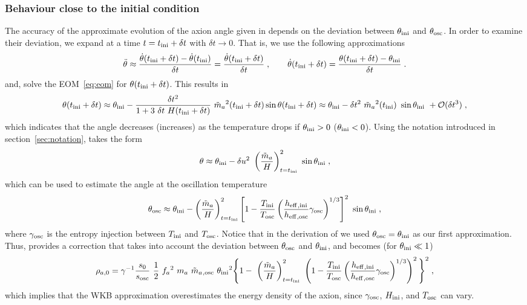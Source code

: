 \documentclass[11pt,a4paper]{article}
\begin{document}
\subsubsection{Behaviour close to the initial condition}\label{sec:close_to_ini}
%
The accuracy of the approximate evolution of the axion angle given in  depends on the deviation between $\theta_{\rm ini}{}$ and $\theta_{\rm osc}{}$. In order to examine their deviation, we expand  at a time $t =t_{\rm ini}{} + \delta t$ with $\delta t \to 0$. That is, we use the following approximations 
%
\begin{equation*}
	\ddot{\theta} \approx \dfrac{\dot \theta (t_{\rm ini}{}+ \delta t)  - \dot \theta (t_{\rm ini}{})}{ \delta  t } =  \dfrac{\dot \theta (t_{\rm ini}{} + \delta t)  }{\delta  t } \;,
	\qquad
	\dot \theta(t_{\rm ini}{} + \delta t) = \dfrac{\theta(t_{\rm ini}{} + \delta t) - \theta_{\rm ini}{}}{\delta t} \;.
\end{equation*} 
%
and, solve the EOM~\ref{eq:eom} for $\theta(t_{\rm ini}{} + \delta t)$. This results in
%
\begin{equation}
	\theta(t_{\rm ini}{} + \delta t)  \approx  \theta_{\rm ini}{} -\dfrac{\delta t^2}{1+3\ \delta t \ H(t_{\rm ini}{} + \delta t) } \  \tilde m_{a}{}^2(t_{\rm ini}{} + \delta t)  \sin \theta(t_{\rm ini}{} + \delta t)  
	\approx   \theta_{\rm ini}{} - \delta t^2 \ \tilde m_{a}{}^2(t_{\rm ini}{}) \ \sin \theta_{\rm ini}{}  \ + \mathcal{O}(\delta t^3)\;, 
	\label{eq:theta_dt}
\end{equation}
%
which indicates that the angle decreases (increases) as the temperature drops if $\theta_{\rm ini}{}>0$ ($\theta_{\rm ini}{}<0$). Using the notation introduced in section~\ref{sec:notation},  takes the form
%
\begin{eqnarray}
	\theta \approx    \thetai - \delta u^2 \ \lrb{\dfrac{\maT}{H}}_{t=\ti}^2 \ \sin \thetai \;,
	\label{eq:theta_du}
\end{eqnarray}
%
which can be used to estimate the angle at the oscillation temperature
%
\begin{eqnarray}
	\theta_{\rm osc}{} \approx    \theta_{\rm ini}{} -  \left( \dfrac{\tilde m_{a}{}}{H} \right)_{t=t_{\rm ini}{}}^2 
	\left[ 1- \dfrac{T_{\rm ini}{}}{T_{\rm osc}{}}\left( \dfrac{h_{\rm eff}{}_{,\rm ini}}{h_{\rm eff}{}_{,\rm osc}}\gamma_{\rm osc} \right)^{1/3} \right]^{2}   \ \sin \theta_{\rm ini}{} \;,
	\label{eq:theta_osc}
\end{eqnarray}
%
where  $\gamma_{\rm osc}$ is the entropy injection between $T_{\rm ini}{}$ and $T_{\rm osc}{}$. Notice that in the derivation of  we used $\theta_{\rm osc} = \theta_{\rm ini}{}$ as our first approximation. Thus,  provides a correction that takes into account the deviation between $\theta_{\rm osc} $ and $ \theta_{\rm ini}{}$, and  becomes (for $\theta_{\rm ini}{} \ll 1$)
%
\begin{eqnarray}
	\rho_{a,0} = \gamma^{-1}  \dfrac{s_0}{s_{\rm osc}} \  \dfrac{1 }{2}  \ f_{a}{}^2 \ m_{a}{} \ \tilde m_{a}{}_{,{\rm osc}} \ \theta_{\rm ini}{}^2 \Bigg\{ 
		1 - \ \left( \dfrac{\tilde m_{a}{}}{H} \right)_{t=t_{\rm ini}{}}^2 \  \left( 1- \dfrac{T_{\rm ini}{}}{T_{\rm osc}{}}\left( \dfrac{h_{\rm eff}{}_{,\rm ini}}{h_{\rm eff}{}_{,\rm osc}}\gamma_{\rm osc} \right)^{1/3} \right)^{2}    \Bigg\}^2    \;,
	\label{eq:rho_a_NLO} 
\end{eqnarray}
%
which implies that the WKB approximation overestimates the energy density of the axion, since $\gamma_{\rm osc}$, $H_{\rm ini}$, and $T_{\rm osc}{}$ can vary. 
\end{document}

